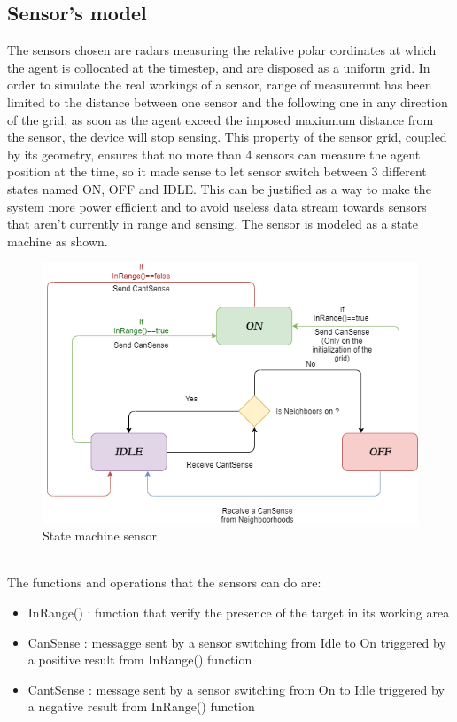 \documentclass[twocolumn]{article}
\begin{document}
    \subsection*{Sensor's model}
    The sensors chosen are radars measuring the relative polar cordinates at which the agent is collocated at the timestep, and
    are disposed as a uniform grid. In order to simulate the real workings of a sensor, range of measuremnt has been limited to the distance
    between one sensor and the following one in any direction of the grid, as soon as the agent exceed the imposed maxiumum distance from the sensor,
    the device will stop sensing.
    This property of the sensor grid, coupled by its geometry, ensures that no more than 4 sensors can measure the agent position at the time,
    so it made sense to let sensor switch between 3 different states named ON, OFF and IDLE. This can be justified as a way to make the system
    more power efficient and to avoid useless data stream towards sensors that aren't currently in range and sensing.
    The sensor is modeled as a state machine as shown.
    \\
    \begin{figure}[h!]
        \centering
        \includegraphics[width=\columnwidth]{sensor_state_machine.png}
        \caption{State machine sensor}
        \label{fig:galaxy}
    \end{figure}
    \\
The functions and operations that the sensors can do are:
\begin{itemize}
    \item InRange() : function that verify the presence of the target in its working area 
    \item CanSense : messagge sent by a sensor switching from Idle to On triggered by a positive result from InRange() function
    \item CantSense : message sent by a sensor switching from On to Idle triggered by a negative result from InRange() function
    \end{itemize}
\end{document}
